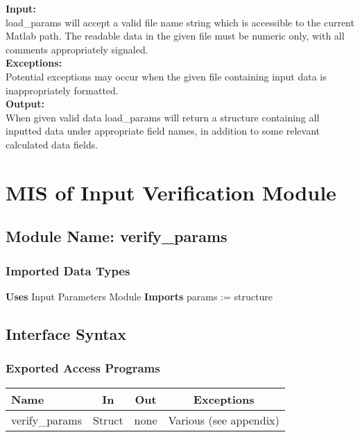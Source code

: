 \documentclass[12pt]{article}
\begin{document}
\noindent \textbf{Input:}\\
load\_{params} will accept a valid file name string which is accessible to the current Matlab path.
The readable data in the given file must be numeric only, with all comments 
appropriately signaled.\\

\noindent \textbf{Exceptions:}\\
Potential exceptions may occur when the given file containing input data is inappropriately formatted. \\  

\noindent \textbf{Output:}\\
When given valid data load\_{params} will return a structure containing all
inputted data under appropriate field names, in addition to some relevant 
calculated data fields.


\section{MIS of Input Verification Module}

\subsection{Module Name: verify\_params}

\subsubsection{Imported Data Types}
\textbf{Uses} Input Parameters Module \textbf{Imports} params := structure

\subsection{Interface Syntax}

\subsubsection{Exported Access Programs}

\begin{center}
	\begin{tabular}{l c c c}
		\hline
		\textbf{Name} & \textbf{In} & \textbf{Out} & \textbf{Exceptions} \\ \hline
		verify\_{params} & Struct & none & Various (see appendix) \\
		\hline
	\end{tabular}
\end{center}
\end{document}
